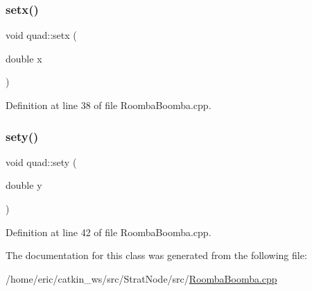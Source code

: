 \mbox{\label{classquad_a4ed6a18261e36c24c57d3443911c7278}} 
\subsubsection{\texorpdfstring{setx()}{setx()}}
{\footnotesize\ttfamily void quad\+::setx (\begin{DoxyParamCaption}\item[{double}]{x }\end{DoxyParamCaption})\hspace{0.3cm}{\ttfamily [inline]}}



Definition at line 38 of file Roomba\+Boomba.\+cpp.

\mbox{\label{classquad_a0f2b37d06e90fedaf899fc38400dc8c4}} 
\subsubsection{\texorpdfstring{sety()}{sety()}}
{\footnotesize\ttfamily void quad\+::sety (\begin{DoxyParamCaption}\item[{double}]{y }\end{DoxyParamCaption})\hspace{0.3cm}{\ttfamily [inline]}}



Definition at line 42 of file Roomba\+Boomba.\+cpp.



The documentation for this class was generated from the following file\+:\begin{DoxyCompactItemize}
\item 
/home/eric/catkin\+\_\+ws/src/\+Strat\+Node/src/\mbox{\hyperlink{RoombaBoomba_8cpp}{Roomba\+Boomba.\+cpp}}\end{DoxyCompactItemize}
